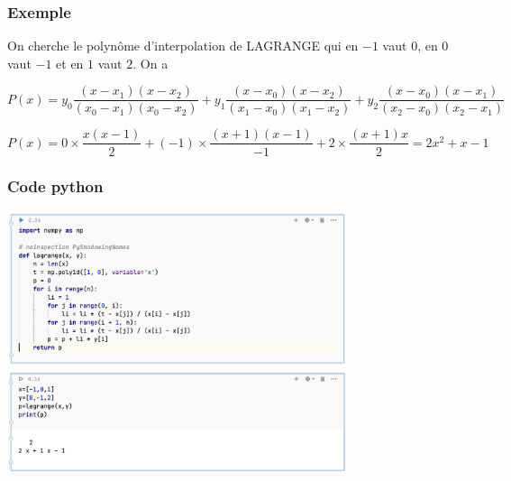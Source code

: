 \documentclass{beamer}
\begin{document}
 \begin{frame}
 \frametitle{Exemple}

On cherche le polynôme d'interpolation de LAGRANGE qui en $-1$ vaut $0$, en $0$ vaut $-1$ et en $1$ vaut $2$. On a
\begin{footnotesize}


\[P(x)=y_0\frac{(x-x_1)(x-x_2)}{(x_0-x_1)(x_0-x_2)}+y_1\frac{(x-x_0)(x-x_2)}{(x_1-x_0)(x_1-x_2)}+y_2\frac{(x-x_0)(x-x_1)}{(x_2-x_0)(x_2-x_1)}\]

\[P(x)=0\times\frac{x(x-1)}{2}+(-1)\times\frac{(x+1)(x-1)}{-1}+2\times\frac{(x+1)x}{2}=2x^2+x-1\]

\end{footnotesize}

\begin{center}
\end{center}
\end{frame}

\begin{frame}
 \frametitle{Code python}
 \begin{center}

\includegraphics[width=10cm]{images/interpolationDeLagrange00.png}
\includegraphics[width=10cm]{images/interpolationDeLagrange01.png}
\end{center}
\end{frame}
\end{document}
